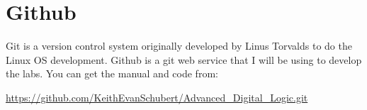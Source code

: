 \chapter{Github}

Git is a version control system originally developed by Linus Torvalds to do the Linux OS development.  Github is a git web service that I will be using to develop the labs.  You can get the manual and code from:

\url{https://github.com/KeithEvanSchubert/Advanced_Digital_Logic.git}

